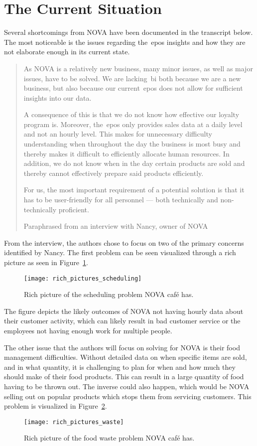 \section{The Current Situation}\label{sec:the-current-situation}

Several shortcomings from NOVA have been documented in the transcript below.
The most noticeable is the issues regarding the~\acrfull{epos} insights and how they are not elaborate enough in its
current state.

\blockquote[Paraphrased from an interview with Nancy, owner of NOVA]{As NOVA is a relatively new business, many minor
issues, as well as major issues, have to be solved.
We are lacking~\acrshort{bi} both because we are a new business, but also because our current~\acrshort{epos} does not
allow for sufficient insights into our data.

A consequence of this is that we do not know how effective our loyalty program is.
Moreover, the~\acrshort{epos} only provides sales data at a daily level and not an hourly level.
This makes for unnecessary difficulty understanding when throughout the day the business is most busy and thereby makes
it difficult to efficiently allocate human resources.
In addition, we do not know when in the day certain products are sold and thereby cannot effectively prepare said
products efficiently.

For us, the most important requirement of a potential solution is that it has to be user-friendly for all personnel —
both technically and non-technically proficient.}

From the interview, the authors chose to focus on two of the primary concerns identified by Nancy.
The first problem can be seen visualized through a rich picture as seen in Figure~\ref{fig:pda-scheduling-problem}.
\begin{figure}[H]
    \centering
    \texttt{[image: rich\_pictures\_scheduling]}
    \caption{Rich picture of the scheduling problem NOVA café has.}\label{fig:pda-scheduling-problem}
\end{figure}
The figure depicts the likely outcomes of NOVA not having hourly data about their customer activity,
which can likely result in bad customer service or the employees not having enough work for multiple people.

The other issue that the authors will focus on solving for NOVA is their food management difficulties.
Without detailed data on when specific items are sold, and in what quantity, it is challenging to plan
for when and how much they should make of their food products.
This can result in a large quantity of food having to be thrown out.
The inverse could also happen, which would be NOVA selling out on popular products which stops them
from servicing customers.
This problem is visualized in Figure~\ref{fig:pda-waste-problem}.

\begin{figure}[H]
    \centering
    \texttt{[image: rich\_pictures\_waste]}
    \caption{Rich picture of the food waste problem NOVA café has.}\label{fig:pda-waste-problem}
\end{figure}

